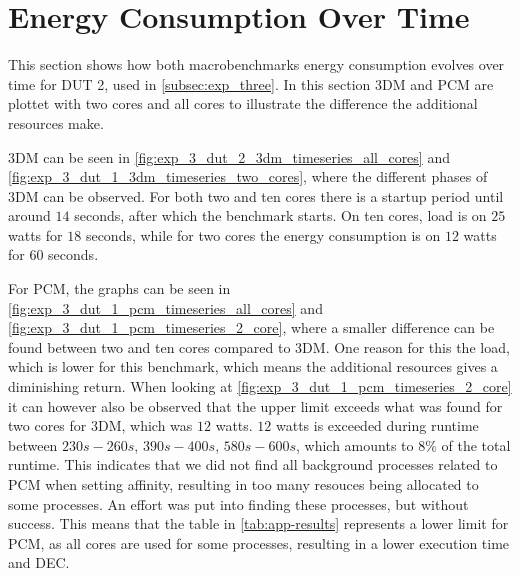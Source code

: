 \section{Energy Consumption Over Time}\label{app:timeseries}

This section shows how both macrobenchmarks energy consumption evolves over time for DUT 2, used in \cref{subsec:exp_three}. In this section 3DM and PCM are plottet with two cores and all cores to illustrate the difference the additional resources make. 

3DM can be seen in \cref{fig:exp_3_dut_2_3dm_timeseries_all_cores} and \cref{fig:exp_3_dut_1_3dm_timeseries_two_cores}, where the different phases of 3DM can be observed. For both two and ten cores there is a startup period until around $14$ seconds, after which the benchmark starts. On ten cores, load is on $25$ watts for $18$ seconds, while for two cores the energy consumption is on $12$ watts for $60$ seconds. 




For PCM, the graphs can be seen in \cref{fig:exp_3_dut_1_pcm_timeseries_all_cores} and \cref{fig:exp_3_dut_1_pcm_timeseries_2_core}, where a smaller difference can be found between two and ten cores compared to 3DM. One reason for this the load, which is lower for this benchmark, which means the additional resources gives a diminishing return. When looking at \cref{fig:exp_3_dut_1_pcm_timeseries_2_core} it can however also be observed that the upper limit exceeds what was found for two cores for 3DM, which was $12$ watts. $12$ watts is exceeded during runtime between $230s-260s$, $390s-400s$, $580s-600s$, which amounts to $8\%$ of the total runtime. This indicates that we did not find all background processes related to PCM when setting affinity, resulting in too many resouces being allocated to some processes. An effort was put into finding these processes, but without success. This means that the table in \cref{tab:app-results} represents a lower limit for PCM, as all cores are used for some processes, resulting in a lower execution time and DEC.


